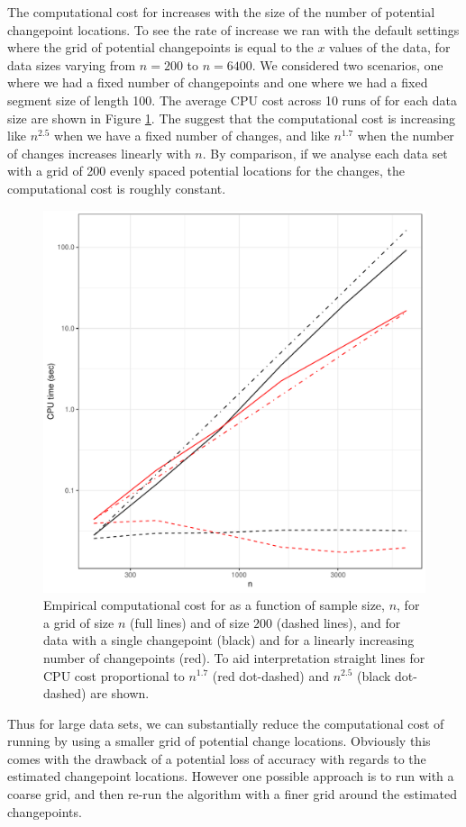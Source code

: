\documentclass[nojss]{jss}
\begin{document}
The computational cost for  increases with the size of the number of potential changepoint locations. To see the rate of increase we ran  with the default settings where the grid of potential changepoints is equal to the $x$ values of the data, for data sizes varying from $n=200$ to $n=6400$. We considered two scenarios, one where we had a fixed number of changepoints and one where we had a fixed segment size of length 100. The average CPU cost across 10 runs of  for each data size are shown in Figure \ref{fig:cpop-CPU}. The suggest that the computational cost is increasing like $n^{2.5}$ when we have a fixed number of changes, and like $n^{1.7}$ when the number of changes increases linearly with $n$. By comparison, if we analyse each data set with a grid of 200 evenly spaced potential locations for the changes, the computational cost is roughly constant.

\begin{figure}
\centering
\includegraphics[width=0.6\linewidth]{figures/cpop_CPU_ggplot.pdf}
\caption{Empirical computational cost for  as a function of sample size, $n$, for a grid of size $n$ (full lines) and of size $200$ (dashed lines), and for data with a single changepoint (black) and for a linearly increasing number of changepoints (red). To aid interpretation straight lines for CPU cost proportional to $n^{1.7}$ (red dot-dashed) and $n^{2.5}$ (black dot-dashed) are shown.}
\label{fig:cpop-CPU}
\end{figure}

Thus for large data sets, we can substantially reduce the computational cost of running  by using a smaller grid of potential change locations. Obviously this comes with the drawback of a potential loss of accuracy with regards to the estimated changepoint locations. However one possible approach is to run  with a coarse grid, and then re-run the algorithm with a finer grid around the estimated changepoints.
\end{document}
